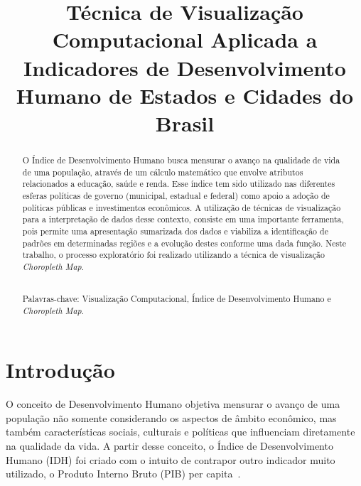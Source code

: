 \documentclass[conference]{IEEEtran}
\begin{document}
\renewcommand{\abstractname}{Resumo}
\renewcommand{\refname}{REFERÊNCIAS}
\renewcommand{\tablename}{TABELA}


\title{Técnica de Visualização Computacional Aplicada a Indicadores de Desenvolvimento Humano de Estados e Cidades do Brasil}


\author{
}



\maketitle

\begin{abstract}

O Índice de Desenvolvimento Humano busca mensurar o avanço na qualidade de vida de uma população, através de um cálculo matemático que envolve atributos relacionados a educação, saúde e renda. Esse índice tem sido utilizado nas diferentes esferas políticas de governo (municipal, estadual e federal) como apoio a adoção de políticas públicas e investimentos econômicos. A utilização de técnicas de visualização para a interpretação de dados desse contexto, consiste em uma importante ferramenta, pois permite uma apresentação sumarizada dos dados e viabiliza a identificação de padrões em determinadas regiões e a evolução destes conforme uma dada função. Neste trabalho, o processo exploratório foi realizado utilizando a técnica de visualização \textit{Choropleth Map}.

~\\Palavras-chave: Visualização Computacional, Índice de Desenvolvimento Humano e \textit{Choropleth Map}.

\end{abstract}


\IEEEpeerreviewmaketitle


\section{Introdução}
O conceito de Desenvolvimento Humano objetiva mensurar o avanço de uma população não somente considerando os aspectos de âmbito econômico, mas também características sociais, culturais e políticas que influenciam diretamente na qualidade da vida. A partir desse conceito, o Índice de Desenvolvimento Humano (IDH) foi criado com o intuito de contrapor outro indicador muito utilizado, o Produto Interno Bruto (PIB) per capita~\cite{atlas}.
\end{document}
